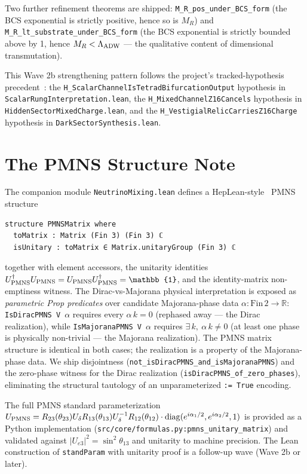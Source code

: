 \documentclass[aps,prd,twocolumn,showpacs,superscriptaddress,nofootinbib]{revtex4-2}
\newcommand{\HeavyMaj}{M_R}
\newcommand{\LambdaADW}{\Lambda_{\rm ADW}}
\newcommand{\PMNSMatrix}{U_{\rm PMNS}}
\begin{document}
Two further refinement theorems are shipped:
\texttt{M\_R\_pos\_under\_BCS\_form} (the BCS exponential is strictly
positive, hence so is $\HeavyMaj$) and
\texttt{M\_R\_lt\_substrate\_under\_BCS\_form} (the BCS exponential is
strictly bounded above by 1, hence $\HeavyMaj < \LambdaADW$ — the
qualitative content of dimensional transmutation).

This Wave 2b strengthening pattern follows the project's tracked-hypothesis
precedent~\cite{TooBySmithHepLean}: the
\texttt{H\_ScalarChannelIsTetradBifurcationOutput} hypothesis in
\texttt{ScalarRungInterpretation.lean}, the
\texttt{H\_MixedChannelZ16Cancels} hypothesis in
\texttt{HiddenSectorMixedCharge.lean}, and the
\texttt{H\_VestigialRelicCarriesZ16Charge} hypothesis in
\texttt{DarkSectorSynthesis.lean}.

\section{The PMNS Structure Note}
\label{sec:pmns}

The companion module \texttt{NeutrinoMixing.lean} defines a
HepLean-style~\cite{TooBySmithHepLean} PMNS structure
\begin{verbatim}
structure PMNSMatrix where
  toMatrix : Matrix (Fin 3) (Fin 3) ℂ
  isUnitary : toMatrix ∈ Matrix.unitaryGroup (Fin 3) ℂ
\end{verbatim}
together with element accessors, the unitarity identities
$\PMNSMatrix^\dagger \PMNSMatrix = \PMNSMatrix \PMNSMatrix^\dagger
= \mathbb{1}$, and the identity-matrix non-emptiness witness. The
Dirac-vs-Majorana physical interpretation is exposed as
\emph{parametric Prop predicates} over candidate Majorana-phase data
$\alpha : \mathrm{Fin}\, 2 \to \mathbb{R}$:
\texttt{IsDiracPMNS V $\alpha$} requires every $\alpha\, k = 0$
(rephased away — the Dirac realization), while
\texttt{IsMajoranaPMNS V $\alpha$} requires $\exists\, k,\ \alpha\, k \neq 0$
(at least one phase is physically non-trivial — the Majorana
realization). The PMNS matrix structure is identical in both cases;
the realization is a property of the Majorana-phase data. We ship
disjointness (\texttt{not\_isDiracPMNS\_and\_isMajoranaPMNS}) and the
zero-phase witness for the Dirac realization
(\texttt{isDiracPMNS\_of\_zero\_phases}), eliminating the structural
tautology of an unparameterized \texttt{:= True} encoding.

The full PMNS standard parameterization
$U_{\rm PMNS} = R_{23}(\theta_{23}) U_\delta R_{13}(\theta_{13})
U_\delta^{-1} R_{12}(\theta_{12}) \cdot
\mathrm{diag}(e^{i\alpha_1/2}, e^{i\alpha_2/2}, 1)$
is provided as a Python implementation
(\texttt{src/core/formulas.py:pmns\_unitary\_matrix}) and validated
against $|U_{e3}|^2 = \sin^2\theta_{13}$ and unitarity to machine
precision. The Lean construction of \texttt{standParam} with
unitarity proof is a follow-up wave (Wave 2b or later).
\end{document}
